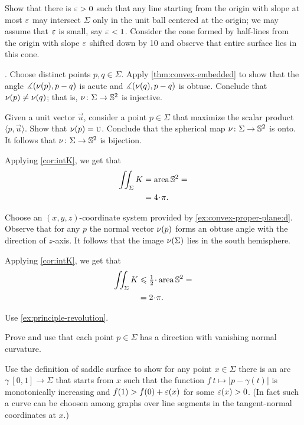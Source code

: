 Show that there is $\varepsilon>0$ such that any line starting from the origin with slope at most $\varepsilon$ may intersect $\Sigma$ only in the unit ball centered at the origin;
we may assume that $\varepsilon$ is small, say $\varepsilon<1$.
Consider the cone formed by half-lines from the origin with slope $\varepsilon$ shifted down by 10 and observe that entire surface lies in this cone.



\parbf{\ref{ex:intK}}.
Choose distinct points $p,q\in\Sigma$.
Apply \ref{thm:convex-embedded} to show that the angle 
$\measuredangle(\nu(p),p-q)$ is acute and $\measuredangle(\nu(q),p-q)$ is obtuse.
Conclude that $\nu(p)\ne\nu(q)$;
that is, $\nu\colon\Sigma\to\mathbb{S}^2$ is injective.


Given a unit vector $\vec u$, consider a point $p\in \Sigma$ that maximize the scalar product $\langle p,\vec u\rangle$.
Show that $\nu(p)=\textsc u$.
Conclude that the spherical map $\nu\colon\Sigma\to\mathbb{S}^2$ is onto.
It follows that $\nu\colon\Sigma\to\mathbb{S}^2$ is bijection.

Applying \ref{cor:intK}, we get that 
\begin{align*}
\iint_\Sigma K&=\area\mathbb{S}^2=
\\
&=4\cdot\pi.
\end{align*}

 Choose an $(x,y,z)$-coordinate system provided by \ref{ex:convex-proper-plane:d}.
Observe that for any $p$ the normal vector $\nu(p)$ forms an obtuse angle with the direction of $z$-axis.
It follows that the image $\nu(\Sigma)$ lies in the south hemisphere.

Applying \ref{cor:intK}, we get that 
\begin{align*}
\iint_\Sigma K&\le \tfrac12\cdot\area\mathbb{S}^2=
\\
&=2\cdot\pi.
\end{align*}

 Use \ref{ex:principle-revolution}.

 Prove and use that each point $p\in\Sigma$ has a direction with vanishing normal curvature.

Use the definition of saddle surface to show for any point $x\in\Sigma$ there is an arc $\gamma\:[0,1]\to\Sigma$ that starts from $x$ such that 
the function $f\:t\mapsto |p-\gamma(t)|$ is monotonically increasing and $f(1)>f(0)+\varepsilon(x)$ for some $\varepsilon(x)>0$.
(In fact such a curve can be choosen among graphs over line segments in the tangent-normal coordinates at $x$.)

